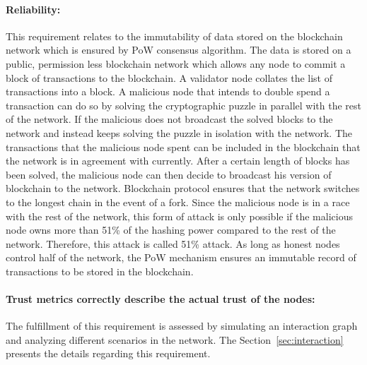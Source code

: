 %
%		
\vspace{-15mm}
\paragraph{Reliability:}This requirement relates to the immutability of data
stored on the blockchain network which is ensured by \ac{PoW} consensus
algorithm. The data is stored on a public, permission less blockchain network
which allows any node to commit a block of transactions to the blockchain. A
validator node collates the list of transactions into a block. A malicious node
that intends to double spend a transaction can do so by solving the
cryptographic puzzle in parallel with the rest of the network. If the malicious
does not broadcast the solved blocks to the network and instead keeps solving
the puzzle in isolation with the network. The transactions that the malicious
node spent can be included in the blockchain that the network is in agreement
with currently. After a certain length of blocks has been solved, the malicious
node can then decide to broadcast his version of blockchain to the network.
Blockchain protocol ensures that the network switches to the longest chain in
the event of a fork. Since the malicious node is in a race with the rest of the
network, this form of attack is only possible if the malicious node owns more
than 51\% of the hashing power compared to the rest of the network. Therefore,
this attack is called 51\% attack. As long as honest nodes control half of the
network, the \ac{PoW} mechanism ensures an immutable record of transactions to
be stored in the blockchain.

\paragraph{Trust metrics correctly describe the actual trust of the nodes:}The
fulfillment of this requirement is assessed by simulating an interaction graph
and analyzing different scenarios in the network. The
Section~\ref{sec:interaction} presents the details regarding this requirement. 

